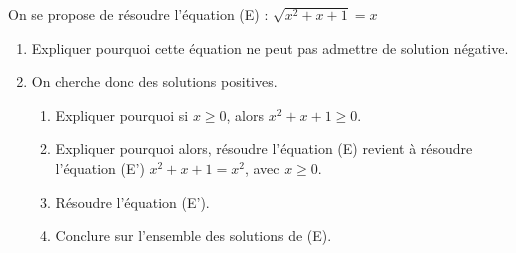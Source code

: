 
On se propose de résoudre l'équation (E) : $\sqrt{x^2+x+1}=x$
\begin{enumerate}
\item Expliquer pourquoi cette équation ne peut pas admettre de solution négative.
\item On cherche donc des solutions positives.
\begin{enumerate}
\item Expliquer pourquoi si $x \geq 0$, alors $x^2+x+1 \geq 0$.
\item Expliquer pourquoi alors, résoudre l'équation (E) revient à résoudre l'équation (E') $x^2+x+1=x^2$, avec $x \geq 0$.
\item Résoudre l'équation (E').
\item Conclure sur l'ensemble des solutions de (E).
\end{enumerate}
\end{enumerate}